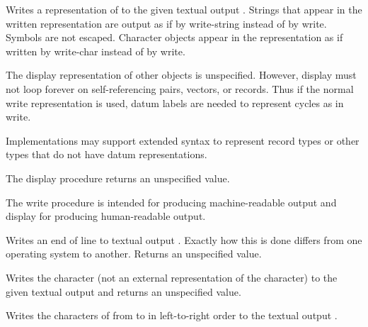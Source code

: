 \begin{entry}{%
}

Writes a representation of  to the given textual output .
Strings that appear in the written representation are output as if by
{\cf write-string} instead of by {\cf write}.
Symbols are not escaped.  Character
objects appear in the representation as if written by {\cf write-char}
instead of by {\cf write}.

The {\cf display} representation of other objects is unspecified.
However, {\cf display} must not loop forever on 
self-referencing pairs, vectors, or records.  Thus if the
normal {\cf write} representation is used, datum labels are needed
to represent cycles as in {\cf write}.

Implementations may support extended syntax to represent record types or
other types that do not have datum representations.

The {\cf display} procedure returns an unspecified value.

\begin{rationale}
The {\cf write} procedure is intended
for producing mach\-ine-readable output and {\cf display} for producing
human-readable output.  
\end{rationale}
\end{entry}


\begin{entry}{%
}

Writes an end of line to textual output .  Exactly how this
is done differs
from one operating system to another.  Returns an unspecified value.

\end{entry}


\begin{entry}{%
}

Writes the character  (not an external representation of the
character) to the given textual output  and returns an unspecified
value.  

\end{entry}

\begin{entry}{%
}

Writes the characters of 
from  to 
in left-to-right order to the
textual output .

\end{entry}

